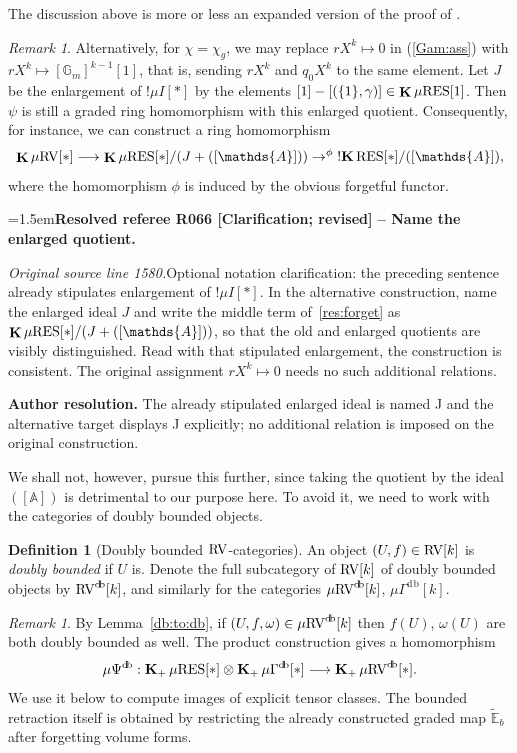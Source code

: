 \documentclass[12pt]{amsart}
\newcommand{\ResolvedRefereeRemark}[5]{%
  \par\medskip\begingroup\normalfont\small\color{gray}%
  \emergencystretch=1.5em\noindent\textbf{Resolved referee R#1 [#2] -- #3.}\par\nobreak\noindent #4\par
  \medskip\color{ResolutionGreen}\noindent\textbf{Author resolution.} #5\par
  \endgroup\medskip
}
\newcommand{\memph}[1]{{\color{magenta}\emph{#1}}}
\theoremstyle{plain}
\theoremstyle{definition}
\newtheorem{defn}[thm]{Definition}
\theoremstyle{remark}
\newtheorem{rem}[thm]{Remark}
\numberwithin{equation}{section}
\theoremstyle{plain}
\newcommand{\RV}{\textup{RV}}
\newcommand{\A}{\mathds{A}}
\newcommand{\G}{\mathds{G}}
\newcommand{\0}{\emptyset}
\newcommand{\bb}[1]{\mathbb{#1}}
\newcommand{\fun}{\longrightarrow}
\newcommand{\efun}{\longmapsto}
\newcommand{\mgRV}{{\mu}{\RV}}
\newcommand{\mG}{{\mu}{\Gamma}}
\newcommand{\RES}{\textup{RES}}
\newcommand{\mgRES}{{\mu}{\RES}}
\DeclareMathOperator{\gsk}{\mathbf{K}_+}
\DeclareMathOperator{\ggk}{\mathbf{K}}
\DeclareMathOperator{\sggk}{!\mathbf{K}}
\DeclareMathOperator{\db}{d \! b}
\begin{document}
The discussion above is more or less an expanded version of the proof of \cite[Theorem~10.11]{hrushovski:kazhdan:integration:vf}.

\begin{rem}
Alternatively, for $\chi = \chi_{g}$, we may replace $r X^k \efun 0$ in (\ref{Gam:ass}) with $r X^k \efun [\G_m]^{k-1}[1]$, that is, sending $r X^k$ and $q_0 X^k$ to the same element.  Let $J$ be the enlargement of $!\mu I[*]$ by the elements $[1]-[(\{1\},\gamma)]\in\ggk\mgRES[1]$. Then $\psi$ is still a graded ring homomorphism with this enlarged quotient. Consequently, for instance, we can construct a ring homomorphism
\begin{equation}\label{res:forget}
\ggk \mgRV[*] \fun \ggk \mgRES[*] / (J+([\A])) \to^{\phi} \sggk \RES[*] / ([\A]),
\end{equation}
where the homomorphism $\phi$ is induced by the obvious forgetful functor.

\ResolvedRefereeRemark{066}{Clarification; revised}{Name the enlarged quotient}{%
\textit{Original source line 1580.}\quad Optional notation clarification: the preceding sentence already stipulates enlargement of $!\mu I[*]$. In the alternative construction, name the enlarged ideal $J$ and write the middle term of~\eqref{res:forget} as $\ggk\mgRES[*]/(J+([\A]))$, so that the old and enlarged quotients are visibly distinguished. Read with that stipulated enlargement, the construction is consistent. The original assignment $rX^k\mapsto0$ needs no such additional relations.
}{The already stipulated enlarged ideal is named J and the alternative target displays J explicitly; no additional relation is imposed on the original construction.}

We shall not, however, pursue this further, since taking the quotient by the ideal $([\A])$ is detrimental to our purpose here. To avoid it, we need to work with the categories of doubly bounded objects.
\end{rem}

\begin{defn}[Doubly bounded $\RV$-categories]\label{db:RV}
An object $(U, f) \in \RV[k]$ is \memph{doubly bounded} if $U$ is. Denote the full subcategory of $\RV[k]$ of doubly bounded objects by $\RV^{\db}[k]$, and similarly for the categories $\mgRV^{\db}[k]$, $\mG^{\db}[k]$.
\end{defn}




\begin{rem}\label{tensor:bd}
By Lemma~\ref{db:to:db}, if $(U, f, \omega) \in \mgRV^{\db}[k]$ then $f(U)$, $\omega(U)$ are both doubly bounded as well.
The product construction gives a homomorphism
\[
{\mu}\Psi^{\db}:\gsk\mgRES[*]\otimes\gsk\mG^{\db}[*]
\fun\gsk\mgRV^{\db}[*].
\]
We use it below to compute images of explicit tensor classes. The bounded retraction itself is obtained by restricting the already constructed graded map $\widetilde{\bb E}_b$ after forgetting volume forms.
\end{rem}
\end{document}
